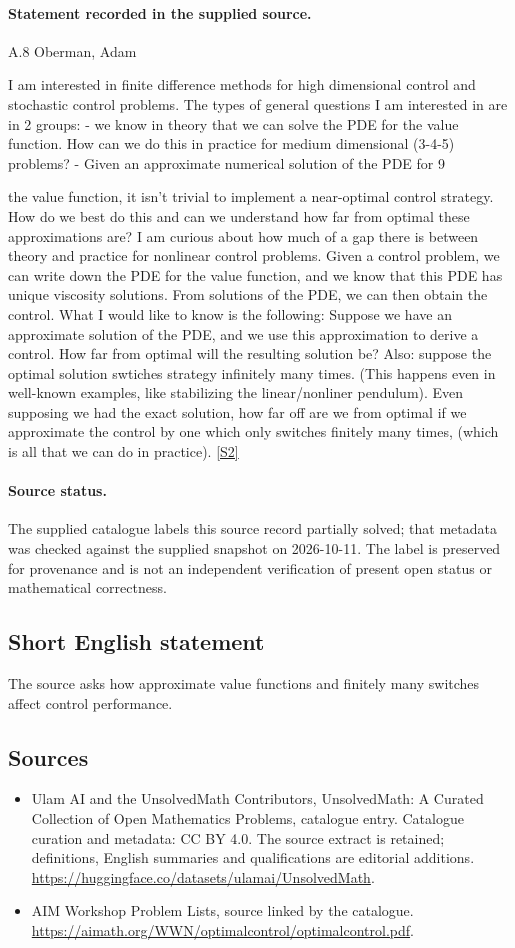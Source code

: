 \documentclass[11pt]{article}
\begin{document}
\paragraph{Statement recorded in the supplied source.}
A.8 Oberman, Adam

I am interested in finite difference methods for high dimensional control and stochastic control problems. The types of general questions I am interested in are in 2 groups: - we know in theory that we can solve the PDE for the value function. How can we do this in practice for medium dimensional (3-4-5) problems? - Given an approximate numerical solution of the PDE for 9

the value function, it isn't trivial to implement a near-optimal control strategy. How do we best do this and can we understand how far from optimal these approximations are? I am curious about how much of a gap there is between theory and practice for nonlinear control problems. Given a control problem, we can write down the PDE for the value function, and we know that this PDE has unique viscosity solutions. From solutions of the PDE, we can then obtain the control. What I would like to know is the following: Suppose we have an approximate solution of the PDE, and we use this approximation to derive a control. How far from optimal will the resulting solution be? Also: suppose the optimal solution swtiches strategy infinitely many times. (This happens even in well-known examples, like stabilizing the linear/nonliner pendulum). Even supposing we had the exact solution, how far off are we from optimal if we approximate the control by one which only switches finitely many times, (which is all that we can do in practice). \href{https://aimath.org/WWN/optimalcontrol/optimalcontrol.pdf}{[S2]}
\paragraph{Source status.}
The supplied catalogue labels this source record partially solved; that metadata was checked against the supplied snapshot on 2026-10-11. The label is preserved for provenance and is not an independent verification of present open status or mathematical correctness.
\subsection{Short English statement}
The source asks how approximate value functions and finitely many switches affect control performance.
\subsection{Sources}
\begin{itemize}
\item[S1] Ulam AI and the UnsolvedMath Contributors, UnsolvedMath: A Curated Collection of Open Mathematics Problems, catalogue entry. Catalogue curation and metadata: CC BY 4.0. The source extract is retained; definitions, English summaries and qualifications are editorial additions.
\url{https://huggingface.co/datasets/ulamai/UnsolvedMath}.
\item[S2] AIM Workshop Problem Lists, source linked by the catalogue.
\url{https://aimath.org/WWN/optimalcontrol/optimalcontrol.pdf}.
\end{itemize}
\end{document}
